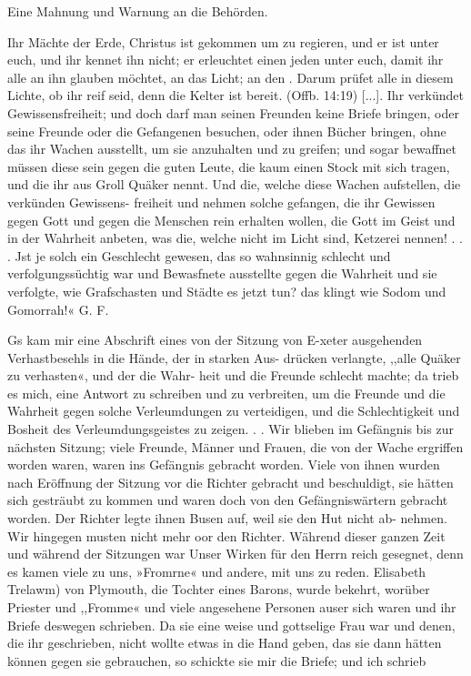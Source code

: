{
Eine Mahnung und Warnung an die Behörden.

\bigskip

Ihr Mächte der Erde, Christus ist gekommen um zu regieren,
und er ist unter euch, und ihr kennet ihn nicht; er erleuchtet einen
jeden unter euch, damit ihr alle an ihn glauben möchtet, an
das Licht; an den . Darum prüfet
alle in diesem Lichte, ob ihr reif seid, denn die Kelter ist bereit.
(Offb. 14:19) [...].
Ihr verkündet Gewissensfreiheit; 
und doch darf man seinen
Freunden keine Briefe bringen, oder seine Freunde oder die
Gefangenen besuchen, oder ihnen Bücher bringen, ohne das ihr
Wachen ausstellt, um sie anzuhalten und zu greifen; und sogar
bewaffnet müssen diese sein gegen die guten Leute, die kaum
einen Stock mit sich tragen, und die ihr aus Groll Quäker nennt.
Und die, welche diese Wachen aufstellen, die verkünden Gewissens-
freiheit und nehmen solche gefangen, die ihr Gewissen gegen Gott
und gegen die Menschen rein erhalten wollen, die Gott im Geist
und in der Wahrheit anbeten, was die, welche nicht im Licht sind,
Ketzerei nennen! . . . Jst je solch ein Geschlecht gewesen, das
so wahnsinnig schlecht und verfolgungssüchtig war und Bewasfnete
ausstellte gegen die Wahrheit und sie verfolgte, wie Grafschasten
und Städte es jetzt tun? das klingt wie Sodom und Gomorrah!«
G. F.

}

Gs kam mir eine Abschrift eines von der Sitzung von E-xeter
ausgehenden Verhastbesehls in die Hände, der in starken Aus-
drücken verlangte, ,,alle Quäker zu verhasten«, und der die Wahr-
heit und die Freunde schlecht machte; da trieb es mich, eine
Antwort zu schreiben und zu verbreiten, um die Freunde und
die Wahrheit gegen solche Verleumdungen zu verteidigen, und
die Schlechtigkeit und Bosheit des Verleumdungsgeistes zu zeigen. . .
Wir blieben im Gefängnis bis zur nächsten Sitzung; viele
Freunde, Männer und Frauen, die von der Wache ergriffen
worden waren, waren ins Gefängnis gebracht worden. Viele
von ihnen wurden nach Eröffnung der Sitzung vor die Richter
gebracht und beschuldigt, sie hätten sich gesträubt zu kommen
und waren doch von den Gefängniswärtern gebracht worden.
Der Richter legte ihnen Busen auf, weil sie den Hut nicht ab-
nehmen. Wir hingegen musten nicht mehr oor den Richter.
Während dieser ganzen Zeit und während der Sitzungen war
Unser Wirken für den Herrn reich gesegnet, denn es kamen viele
zu uns, »Fromrne« und andere, mit uns zu reden. Elisabeth
Trelawm) von Plymouth, die Tochter eines Barons, wurde bekehrt,
worüber Priester und ,,Fromme« und viele angesehene Personen
auser sich waren und ihr Briefe deswegen schrieben. Da sie eine
weise und gottselige Frau war und denen, die ihr geschrieben,
nicht wollte etwas in die Hand geben, das sie dann hätten können
gegen sie gebrauchen, so schickte sie mir die Briefe; und ich schrieb
 


